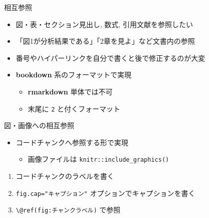 \documentclass[
  ignorenonframetext,
]{beamer}
\providecommand{\tightlist}{%
  \setlength{\itemsep}{0pt}\setlength{\parskip}{0pt}}
\begin{document}
\begin{frame}[fragile]{相互参照}
\protect\hypertarget{ux76f8ux4e92ux53c2ux7167}{}
\begin{itemize}
\item
  図・表・セクション見出し, 数式, 引用文献を参照したい
\item
  「図1が分析結果である」「2章を見よ」など文書内の参照
\item
  番号やハイパーリンクを自分で書くと後で修正するのが大変
\item
  \textbf{bookdown} 系のフォーマットで実現

  \begin{itemize}
  \tightlist
  \item
    \textbf{rmarkdown} 単体では不可
  \item
    末尾に \texttt{2} と付くフォーマット
  \end{itemize}
\end{itemize}
\end{frame}

\begin{frame}[fragile]{図・画像への相互参照}
\protect\hypertarget{ux56f3ux753bux50cfux3078ux306eux76f8ux4e92ux53c2ux7167}{}
\begin{itemize}
\item
  コードチャンクへ参照する形で実現

  \begin{itemize}
  \tightlist
  \item
    画像ファイルは \texttt{knitr::include\_graphics()}
  \end{itemize}
\end{itemize}

\begin{enumerate}
\tightlist
\item
  コードチャンクのラベルを書く
\item
  \texttt{fig.cap="キャプション"} オプションでキャプションを書く
\item
  \texttt{\textbackslash{}@ref(fig:チャンクラベル)} で参照
\end{enumerate}
\end{frame}
\end{document}
